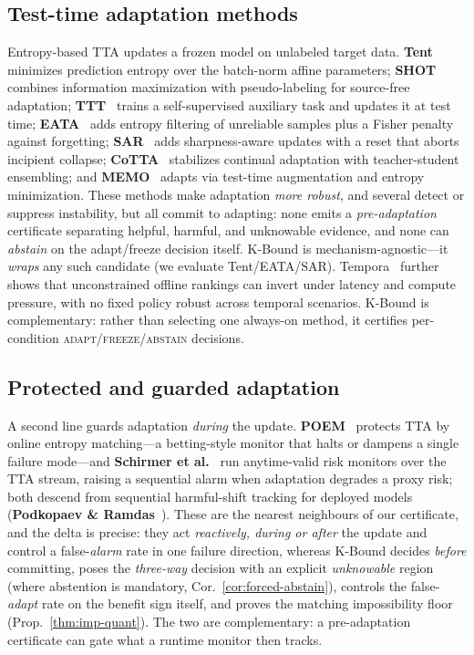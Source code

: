 \documentclass[conference]{IEEEtran}
\theoremstyle{plain}
\theoremstyle{definition}
\begin{document}
\subsection{Test-time adaptation methods}
Entropy-based TTA updates a frozen model on unlabeled target data. \textbf{Tent}~\cite{wang2021tent} minimizes
prediction entropy over the batch-norm affine parameters; \textbf{SHOT}~\cite{liang2020shot} combines information
maximization with pseudo-labeling for source-free adaptation; \textbf{TTT}~\cite{sun2020ttt} trains a
self-supervised auxiliary task and updates it at test time; \textbf{EATA}~\cite{niu2022eata} adds entropy
filtering of unreliable samples plus a Fisher penalty against forgetting; \textbf{SAR}~\cite{niu2023sar}
adds sharpness-aware updates with a reset that aborts incipient collapse; \textbf{CoTTA}~\cite{wang2022cotta}
stabilizes continual adaptation with teacher-student ensembling; and \textbf{MEMO}~\cite{zhang2022memo}
adapts via test-time augmentation and entropy minimization. These methods make
adaptation \emph{more robust}, and several detect or suppress instability, but all commit to
adapting: none emits a \emph{pre-adaptation} certificate separating helpful, harmful, and
unknowable evidence, and none can \emph{abstain} on the adapt/freeze decision itself. K-Bound
is mechanism-agnostic---it \emph{wraps} any such candidate (we evaluate Tent/EATA/SAR).
Tempora~\cite{tempora2026} further shows that unconstrained offline rankings can invert under
latency and compute pressure, with no fixed policy robust across temporal scenarios. K-Bound is
complementary: rather than selecting one always-on method, it certifies per-condition
\textsc{adapt}/\textsc{freeze}/\textsc{abstain} decisions.

\subsection{Protected and guarded adaptation}
A second line guards adaptation \emph{during} the update. \textbf{POEM}~\cite{bar2024poem}
protects TTA by online entropy matching---a betting-style monitor that halts or dampens a
single failure mode---and \textbf{Schirmer et al.}~\cite{schirmer2025monitoring} run anytime-valid risk monitors over the
TTA stream, raising a sequential alarm when adaptation degrades a proxy risk; both descend
from sequential harmful-shift tracking for deployed models (\textbf{Podkopaev \& Ramdas}~\cite{podkopaev2022tracking}).
These are the nearest neighbours of our certificate, and the delta is precise: they act
\emph{reactively, during or after} the update and control a false-\emph{alarm} rate in one
failure direction, whereas K-Bound decides \emph{before} committing, poses the
\emph{three-way} decision with an explicit \emph{unknowable} region (where abstention is
mandatory, Cor.~\ref{cor:forced-abstain}), controls the false-\emph{adapt} rate on the
benefit sign itself, and proves the matching impossibility floor
(Prop.~\ref{thm:imp-quant}). The two are complementary: a pre-adaptation certificate can
gate what a runtime monitor then tracks.
\end{document}
